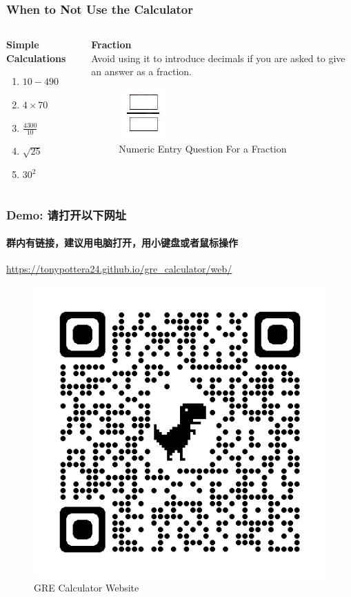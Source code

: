 \documentclass[
	11pt, %
]{beamer}
\begin{document}
\begin{frame}
	\frametitle{When to \alert{Not} Use the Calculator}
	\begin{columns}[t]
		\begin{column}{0.33\textwidth}
			\textbf{Simple Calculations}
			\begin{enumerate}
				\item $10 - 490$
				\item $ 4 \times 70 $
				\item $\frac{4300}{10}$
				\item $\sqrt{25}$
				\item $30^2$
			\end{enumerate}
		\end{column}

		\begin{column}{0.5\textwidth}
		    \textbf{Fraction}\\
		    Avoid using it to introduce decimals if you are asked to give an answer as a fraction.\\
		   \begin{figure}
			    \includegraphics[width=0.3\linewidth]{Numeric_Entry_Questions_Fraction.png}
			    \caption{Numeric Entry Question For a Fraction}
		    \end{figure}
		\end{column}
	\end{columns}
\end{frame}

\begin{frame}
	\frametitle{Demo: 请打开以下网址}
	\framesubtitle{群内有链接，建议用电脑打开，用小键盘或者鼠标操作}
	\url{https://tonypottera24.github.io/gre_calculator/web/}
	\begin{figure}
			    \includegraphics[width=0.5\linewidth]{GRE_Calculator.png}
			    \caption{GRE Calculator Website}
		    \end{figure}
	
\end{frame}
\end{document}
